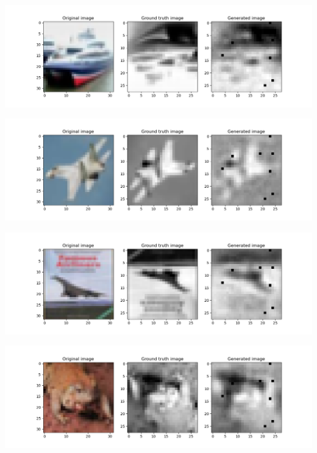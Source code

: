 \documentclass[conference]{IEEEtran}
\begin{document}
\begin{center}
    \begin{minipage}{0.75\linewidth}
        \includegraphics[width=\linewidth]{images/output_1.png}
    \end{minipage}
\end{center}
\begin{center}
    \begin{minipage}{0.75\linewidth}
        \includegraphics[width=\linewidth]{images/output_10.png}
    \end{minipage}
\end{center}
\begin{center}
    \begin{minipage}{0.75\linewidth}
        \includegraphics[width=\linewidth]{images/output_3.png}
    \end{minipage}
\end{center}
\begin{center}
    \begin{minipage}{0.75\linewidth}
        \includegraphics[width=\linewidth]{images/output_5.png}
    \end{minipage}
\end{center}
\end{document}
